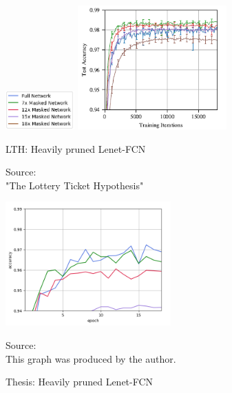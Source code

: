 \begin{figure}
	\begin{minipage}{\textwidth}
		\centering
		\includegraphics[width=100px]{gfx/7-Evaluation/LTH_2_legend.png}
	\end{minipage}
	\begin{minipage}{0.5\textwidth}
		\centering
		\includegraphics[height=180px]{gfx/7-Evaluation/LTH_2.png}
		\caption{LTH: Heavily pruned Lenet-FCN}
		\vspace{7pt}
		\footnotesize{
			Source:\\
			"The Lottery Ticket Hypothesis" \cite{LTH}
		}
		\label{fig:Heavily-Pruned-Lenet-LTH}
	\end{minipage}\hfill
	\begin{minipage}{0.5\textwidth}
		\centering
		\includegraphics[height=180px]{gfx/Experiments/Reproduction-MNIST-FCN/accuracy/LTH_2.png}
		\caption{Thesis: Heavily pruned Lenet-FCN}
		\vspace{7pt}
		\footnotesize{
			Source:\\
			This graph was produced by the author.
		}
		\label{fig:Heavily-Pruned-Lenet-Thesis}
	\end{minipage}
\end{figure}

